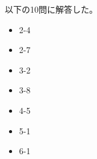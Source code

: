 \documentclass[class=jsarticle, crop=false, dvipdfmx, fleqn]{standalone}
\begin{document}
以下の10問に解答した。
\begin{itemize}
\item 2-4
\item 2-7
\item 3-2
\item 3-8
\item 4-5
\item 5-1
\item 6-1
\end{itemize}
\end{document}
